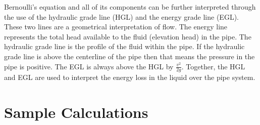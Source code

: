 \documentclass{article}
\begin{document}
\noindent Bernoulli's equation and all of its components can be further interpreted through the use of the hydraulic grade line (HGL) and the energy grade line (EGL).  These two lines are a geometrical interpretation of flow. The energy line represents the total head available to the fluid (elevation head) in the pipe. The hydraulic grade line is the profile of the fluid within the pipe. If the hydraulic grade line is above the centerline of the pipe then that means the pressure in the pipe is positive. The EGL is always above the HGL by $\frac{v^2}{2g}$. Together, the HGL and EGL are used to interpret the energy loss in the liquid over the pipe system.

\newpage
\section{Sample Calculations}
\end{document}
